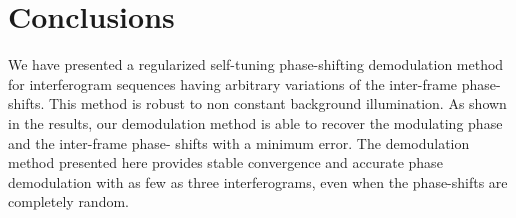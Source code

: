 \documentclass[letterpaper,12pt]{article}   %
\begin{document}
\section{Conclusions}

We have presented a regularized self-tuning phase-shifting demodulation method for 
interferogram sequences having arbitrary variations of the inter-frame phase-shifts. This
method is robust to non constant background illumination. As shown in the results, our 
demodulation method is able to recover the modulating phase and the inter-frame phase-
shifts with a minimum error. The demodulation method presented here provides stable
convergence and accurate phase demodulation with as few as three interferograms, even 
when the phase-shifts are completely random.



\end{document}

